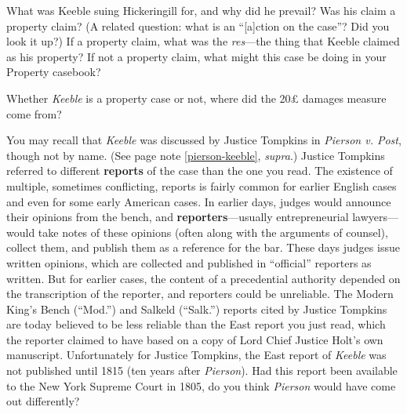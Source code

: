 
\item What was Keeble suing Hickeringill for, and why did he prevail? Was his
claim a property claim? (A related question: what is an ``[a]ction on the
case''? Did you look it up?) If a property claim, what was the
\textit{res}---the thing that Keeble claimed as his property? If not a property
claim, what might this case be doing in your Property casebook? 
\item Whether \textit{Keeble} is a property case or not, where did the
20{\pounds} damages measure come from?
\item You may recall that \textit{Keeble} was discussed by Justice Tompkins in
\textit{Pierson v. Post}, though not by name. (See page
\pageref{pierson-keeble} note \ref{pierson-keeble}, \textit{supra}.) Justice
Tompkins referred to different \textbf{reports} of the case than the one you
read. The existence of
multiple, sometimes conflicting, reports is fairly common for earlier English
cases and even for some early American cases. In earlier days, judges would
announce their opinions from the bench, and \textbf{reporters}---usually
entrepreneurial lawyers---would take notes of these opinions (often along with
the arguments of counsel), collect them, and publish them as a reference for the
bar. These days judges issue written opinions, which are collected and published
in ``official'' reporters as written. But for earlier cases, the content of a
precedential authority depended on the transcription of the reporter, and
reporters could be unreliable. The Modern King's Bench (``Mod.'') and Salkeld
(``Salk.'') reports cited by Justice Tompkins are today believed to be less
reliable than the East report you just read, which the reporter claimed to have
based on a copy of Lord Chief Justice Holt's own manuscript. Unfortunately for
Justice Tompkins, the East report of \textit{Keeble} was not published until
1815 (ten years after \textit{Pierson}). Had this report been available to the
New York Supreme Court in 1805, do you think \textit{Pierson} would have come
out differently?


